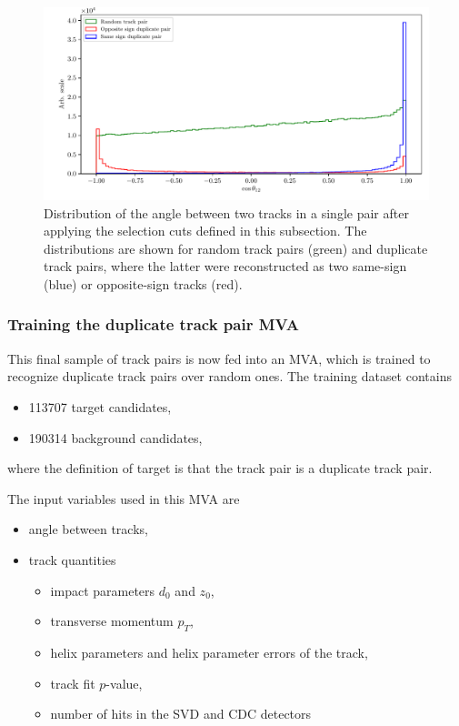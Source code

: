 \begin{figure}[H]
\centering
\captionsetup{width=0.8\linewidth}
\includegraphics[width=\linewidth]{fig/ROECleanup_dup_angle_final}
\caption{Distribution of the angle between two tracks in a single pair after applying the selection cuts defined in this subsection. The distributions are shown for random track pairs (green) and duplicate track pairs, where the latter were reconstructed as two same-sign (blue) or opposite-sign tracks (red).}
\label{fig:ROE_dupAngleFinal}
\end{figure}

\subsubsection{Training the duplicate track pair MVA}
\label{ss:trackMVA}

This final sample of track pairs is now fed into an MVA, which is trained to recognize duplicate track pairs over random ones. The training dataset contains
\begin{itemize}
\item 113707 target candidates,
\item 190314 background candidates,
\end{itemize}
where the definition of target is that the track pair is a duplicate track pair. 

The input variables used in this MVA are
\begin{itemize}
\item angle between tracks,
\item track quantities
	\begin{itemize}
	\item impact parameters $d_0$ and $z_0$,
	\item transverse momentum $p_T$,
	\item helix parameters and helix parameter errors of the track,
	\item track fit $p$-value,
	\item number of hits in the SVD and CDC detectors
	\end{itemize}
\end{itemize}


